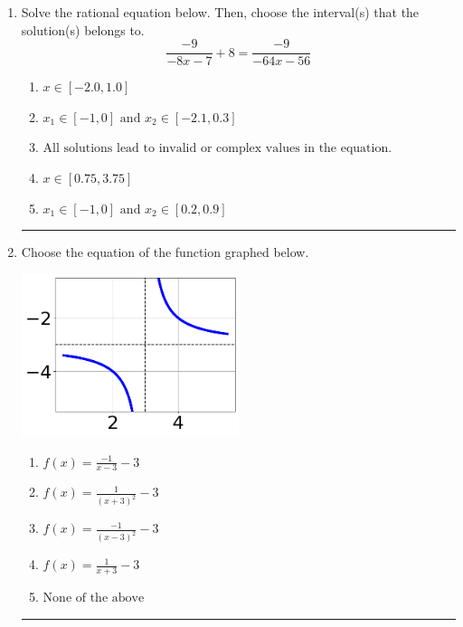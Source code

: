 \documentclass[14pt]{extbook}
\newcommand{\litem}[1]{\item#1\hspace*{-1cm}\rule{\textwidth}{0.4pt}}
\begin{document}
\begin{enumerate}
{\begin{enumerate}[label=\Alph*.]
\end{enumerate} }
\litem{
Solve the rational equation below. Then, choose the interval(s) that the solution(s) belongs to.\[ \frac{-9}{-8x -7} + 8 = \frac{-9}{-64x -56} \]\begin{enumerate}[label=\Alph*.]
\item \( x \in [-2.0,1.0] \)
\item \( x_1 \in [-1, 0] \text{ and } x_2 \in [-2.1,0.3] \)
\item \( \text{All solutions lead to invalid or complex values in the equation.} \)
\item \( x \in [0.75,3.75] \)
\item \( x_1 \in [-1, 0] \text{ and } x_2 \in [0.2,0.9] \)

\end{enumerate} }
\litem{
Choose the equation of the function graphed below.
\begin{center}
    \includegraphics[width=0.5\textwidth]{../Figures/rationalGraphToEquationCopyC.png}
\end{center}
\begin{enumerate}[label=\Alph*.]
\item \( f(x) = \frac{-1}{x - 3} - 3 \)
\item \( f(x) = \frac{1}{(x + 3)^2} - 3 \)
\item \( f(x) = \frac{-1}{(x - 3)^2} - 3 \)
\item \( f(x) = \frac{1}{x + 3} - 3 \)
\item \( \text{None of the above} \)


\end{enumerate}}
\end{enumerate}
\end{document}
